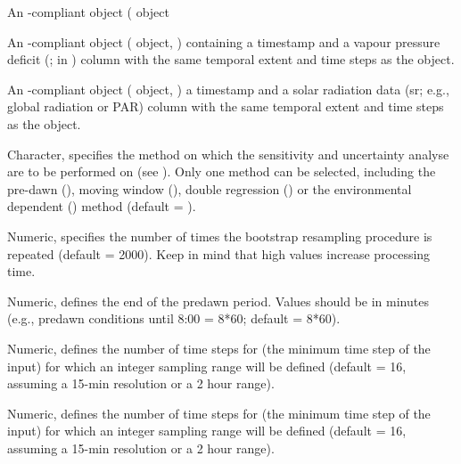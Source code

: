 \documentclass[a4paper]{book}
\begin{document}
\begin{Arguments}
\begin{ldescription}
\item[\code{input}] An -compliant object ( object

\item[\code{vpd.input}] An -compliant object ( object,
) containing a timestamp and a vapour pressure deficit
(; in ) column with the same temporal extent and time steps as the  object.

\item[\code{sr.input}] An -compliant object ( object,
) a timestamp and a solar radiation data (sr; e.g., global radiation or PAR)
column with the same temporal extent and time steps as the  object.

\item[\code{method}] Character, specifies the  method on which the
sensitivity and uncertainty analyse are to be performed on (see ).
Only one method can be selected, including the pre-dawn (), moving window (),
double regression () or the environmental dependent () method (default = ).

\item[\code{n}] Numeric, specifies the number of times the bootstrap resampling procedure is repeated (default = 2000).
Keep in mind that high values increase processing time.

\item[\code{zero.end}] Numeric, defines the end of the predawn period.
Values should be in minutes (e.g., predawn conditions until 8:00 = 8*60; default = 8*60).

\item[\code{range.end}] Numeric, defines the number of time steps for  (the minimum time step of the input)
for which an integer sampling range will be defined (default = 16, assuming a 15-min resolution or a 2 hour range).

\item[\code{zero.start}] Numeric, defines the number of time steps for  (the minimum time step of the input)
for which an integer sampling range will be defined (default = 16, assuming a 15-min resolution or a 2 hour range).


\end{ldescription}
\end{Arguments}
\end{document}

